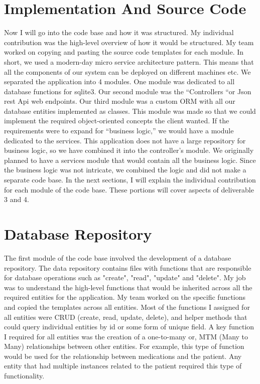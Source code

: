 \documentclass{article}
\begin{document}
\section{Implementation And Source Code }
Now I will go into the code base and how it was structured. My individual contribution was the high-level overview of how it would be structured. My team worked on copying and pasting the source code templates for each module. In short, we used a modern-day micro service architecture pattern. This means that all the components of our system can be deployed on different machines etc. We separated the application into 4 modules. One module was dedicated to all database functions for sqlite3. Our second module was the “Controllers “or Json rest Api web endpoints. Our third module was a custom ORM with all our database entities implemented as classes. This module was made so that we could implement the required object-oriented concepts the client wanted. If the requirements were to expand for “business logic,” we would have a module dedicated to the services. This application does not have a large repository for business logic, so we have combined it into the controller's module. We originally planned to have a services module that would contain all the business logic. Since the business logic was not intricate, we combined the logic and did not make a separate code base. In the next sections, I will explain the individual contribution for each module of the code base. These portions will cover aspects of deliverable 3 and 4.   
 
 
\section{Database Repository }
The first module of the code base involved the development of a database repository. The data repository contains files with functions that are responsible for database operations such as "create", "read", "update" and "delete". My job was to understand the high-level functions that would be inherited across all the required entities for the application. My team worked on the specific functions and copied the templates across all entities. Most of the functions I assigned for all entities were CRUD (create, read, update, delete), and helper methods that could query individual entities by id or some form of unique field. A key function I required for all entities was the creation of a one-to-many or, MTM (Many to Many) relationships between other entities. For example, this type of function would be used for the relationship between medications and the patient. Any entity that had multiple instances related to the patient required this type of functionality.  
\end{document}
